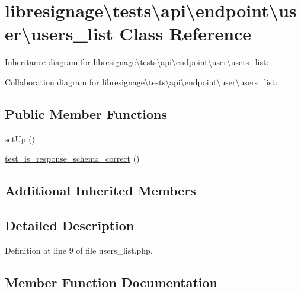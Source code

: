 \hypertarget{classlibresignage_1_1tests_1_1api_1_1endpoint_1_1user_1_1users__list}{}\section{libresignage\textbackslash{}tests\textbackslash{}api\textbackslash{}endpoint\textbackslash{}user\textbackslash{}users\+\_\+list Class Reference}
\label{classlibresignage_1_1tests_1_1api_1_1endpoint_1_1user_1_1users__list}


Inheritance diagram for libresignage\textbackslash{}tests\textbackslash{}api\textbackslash{}endpoint\textbackslash{}user\textbackslash{}users\+\_\+list\+:


Collaboration diagram for libresignage\textbackslash{}tests\textbackslash{}api\textbackslash{}endpoint\textbackslash{}user\textbackslash{}users\+\_\+list\+:
\subsection*{Public Member Functions}
\begin{DoxyCompactItemize}
\item 
\hyperlink{classlibresignage_1_1tests_1_1api_1_1endpoint_1_1user_1_1users__list_a4e9552b041b864a29d2c61d2570923df}{set\+Up} ()
\item 
\hyperlink{classlibresignage_1_1tests_1_1api_1_1endpoint_1_1user_1_1users__list_a5bad357968fa54cebc990700329f79c6}{test\+\_\+is\+\_\+response\+\_\+schema\+\_\+correct} ()
\end{DoxyCompactItemize}
\subsection*{Additional Inherited Members}


\subsection{Detailed Description}


Definition at line 9 of file users\+\_\+list.\+php.



\subsection{Member Function Documentation}
\mbox{\label{classlibresignage_1_1tests_1_1api_1_1endpoint_1_1user_1_1users__list_a4e9552b041b864a29d2c61d2570923df}} 
